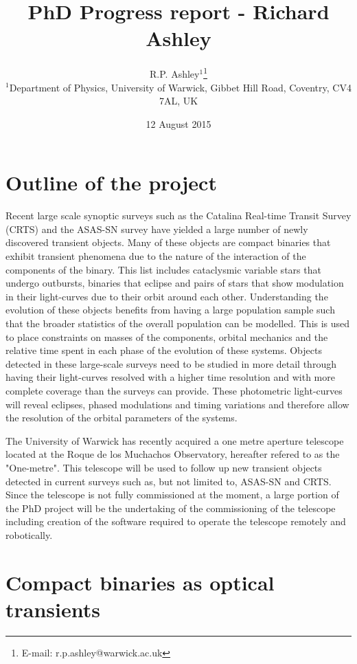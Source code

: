 \documentclass[a4paper,fleqn,usenatbib]{mnras}
\title[Richard Ashley - PhD project]{PhD Progress report - Richard Ashley}
\author[R.P. Ashley et al.]{
R.P. Ashley$^{1}$\thanks{E-mail: r.p.ashley@warwick.ac.uk}\\
$^{1}$Department of Physics, University of Warwick, Gibbet Hill Road, Coventry, CV4 7AL, UK\\
}
\date{12 August 2015}
\begin{document}
\label{firstpage}
\pagerange{\pageref{firstpage}--\pageref{lastpage}}
\maketitle




\section{Outline of the project}
Recent large scale synoptic surveys such as the Catalina Real-time Transit Survey (CRTS)  and the ASAS-SN survey have yielded a large number of newly discovered transient objects. Many of these objects are compact binaries that exhibit transient phenomena due to the nature of the interaction of the components of the binary. This list includes cataclysmic variable stars that undergo outbursts, binaries that eclipse and pairs of stars that show modulation in their light-curves due to their orbit around each other. Understanding the evolution of these objects benefits from having a large population sample such that the broader statistics of the overall population can be modelled. This is used to place constraints on masses of the components, orbital mechanics and the relative time spent in each phase of the evolution of these systems. Objects detected in these large-scale surveys need to be studied in more detail through having their light-curves resolved with a higher time resolution and with more complete coverage than the surveys can provide. These photometric light-curves will reveal eclipses, phased modulations and timing variations and therefore allow the resolution of the orbital parameters of the systems. 

The University of Warwick has recently acquired a one metre aperture telescope located at the Roque de los Muchachos Observatory, hereafter refered to as the "One-metre". This telescope will be used to follow up new transient objects detected in current surveys such as, but not limited to, ASAS-SN and CRTS. Since the telescope is not fully commissioned at the moment, a large portion of the PhD project will be the undertaking of the commissioning of the telescope including creation of the software required to operate the telescope remotely and robotically. 


\section{Compact binaries as optical transients}
\end{document}

